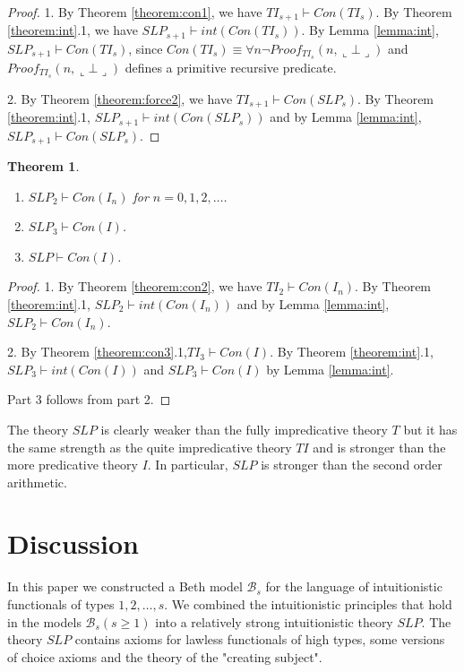 \documentclass{asl}
\newtheorem{theorem}{Theorem}[section]
\theoremstyle{definition}
\begin{document}
\begin{proof}
1. By Theorem \ref{theorem:con1}, we have $TI_{s+1}\vdash Con(TI_s)$. By Theorem \ref{theorem:int}.1, we have $SLP_{s+1}\vdash int(Con(TI_s))$. By Lemma \ref{lemma:int}, $SLP_{s+1}\vdash Con(TI_s)$, since $Con(TI_s)\equiv \forall n\neg Proof_{TI_s}(n,\llcorner \bot\lrcorner)$ and $Proof_{TI_s}(n,\llcorner \bot\lrcorner)$ defines a primitive recursive predicate.

2. By Theorem \ref{theorem:force2}, we have $TI_{s+1}\vdash Con(SLP_s)$. By Theorem \ref{theorem:int}.1, $SLP_{s+1}\vdash int(Con(SLP_s))$ and by Lemma \ref{lemma:int}, $SLP_{s+1}\vdash Con(SLP_s)$.
\end{proof}

\begin{theorem}
\begin{enumerate}
\item $SLP_2\vdash Con(I_n)$ for $n=0,1,2,\ldots$.
\item $SLP_3\vdash Con(I)$.
\item $SLP\vdash Con(I)$.
\end{enumerate}
\label{theorem:con5}
\end{theorem}
\begin{proof}
1. By Theorem \ref{theorem:con2}, we have $TI_2\vdash Con(I_n)$. By Theorem \ref{theorem:int}.1, $SLP_2\vdash int(Con(I_n))$ and by Lemma \ref{lemma:int}, $SLP_2\vdash Con(I_n)$.

2. By Theorem \ref{theorem:con3}.1,$TI_3\vdash Con(I)$. By Theorem \ref{theorem:int}.1, $SLP_3\vdash int(Con(I))$ and  $SLP_3\vdash Con(I)$ by Lemma \ref{lemma:int}.

Part 3 follows from part 2.
\end{proof}

The theory $SLP$ is clearly weaker than the fully impredicative theory $T$ but  it has the same strength as the quite impredicative theory $TI$ and is stronger than the more predicative theory $I$. In particular, $SLP$ is stronger than the second order arithmetic.

\section{Discussion}

In this paper we constructed a Beth model $\mathcal{B}_s$ for the language of intuitionistic functionals of types $1, 2, \ldots, s$. We combined the intuitionistic principles that hold in the models $\mathcal{B}_s (s\geqslant 1)$ into a relatively strong intuitionistic theory $SLP$. The theory $SLP$ contains axioms for lawless functionals of high types, some versions of choice axioms and the theory of the "creating subject". 
\end{document}
